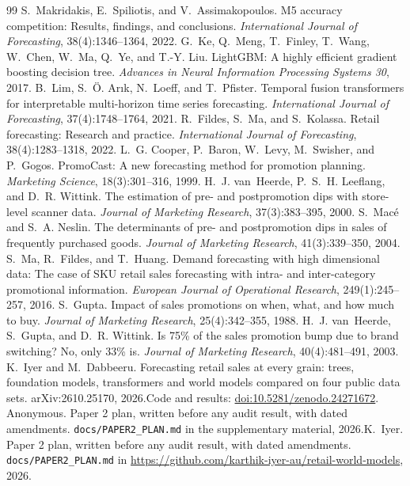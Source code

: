 \begin{thebibliography}{99}
 S.~Makridakis, E.~Spiliotis, and V.~Assimakopoulos. M5 accuracy competition: Results, findings, and conclusions. \emph{International Journal of Forecasting}, 38(4):1346--1364, 2022.
 G.~Ke, Q.~Meng, T.~Finley, T.~Wang, W.~Chen, W.~Ma, Q.~Ye, and T.-Y. Liu. LightGBM: A highly efficient gradient boosting decision tree. \emph{Advances in Neural Information Processing Systems 30}, 2017.
 B.~Lim, S.~\"O. Ar{\i}k, N.~Loeff, and T.~Pfister. Temporal fusion transformers for interpretable multi-horizon time series forecasting. \emph{International Journal of Forecasting}, 37(4):1748--1764, 2021.
 R.~Fildes, S.~Ma, and S.~Kolassa. Retail forecasting: Research and practice. \emph{International Journal of Forecasting}, 38(4):1283--1318, 2022.
 L.~G. Cooper, P.~Baron, W.~Levy, M.~Swisher, and P.~Gogos. PromoCast: A new forecasting method for promotion planning. \emph{Marketing Science}, 18(3):301--316, 1999.
 H.~J. van~Heerde, P.~S.~H. Leeflang, and D.~R. Wittink. The estimation of pre- and postpromotion dips with store-level scanner data. \emph{Journal of Marketing Research}, 37(3):383--395, 2000.
 S.~Mac\'e and S.~A. Neslin. The determinants of pre- and postpromotion dips in sales of frequently purchased goods. \emph{Journal of Marketing Research}, 41(3):339--350, 2004.
 S.~Ma, R.~Fildes, and T.~Huang. Demand forecasting with high dimensional data: The case of SKU retail sales forecasting with intra- and inter-category promotional information. \emph{European Journal of Operational Research}, 249(1):245--257, 2016.
 S.~Gupta. Impact of sales promotions on when, what, and how much to buy. \emph{Journal of Marketing Research}, 25(4):342--355, 1988.
 H.~J. van~Heerde, S.~Gupta, and D.~R. Wittink. Is 75\% of the sales promotion bump due to brand switching? No, only 33\% is. \emph{Journal of Marketing Research}, 40(4):481--491, 2003.
 K.~Iyer and M.~Dabbeeru. Forecasting retail sales at every grain: trees, foundation models, transformers and world models compared on four public data sets. arXiv:2610.25170, 2026.\iftmlr\else Code and results: \href{https://doi.org/10.5281/zenodo.24271672}{doi:10.5281/zenodo.24271672}.\fi
{} \iftmlr Anonymous. Paper 2 plan, written before any audit result, with dated amendments. \texttt{docs/PAPER2\_PLAN.md} in the supplementary material, 2026.\else K.~Iyer. Paper 2 plan, written before any audit result, with dated amendments. \texttt{docs/PAPER2\_PLAN.md} in \url{https://github.com/karthik-iyer-au/retail-world-models}, 2026.\fi

\end{thebibliography}
